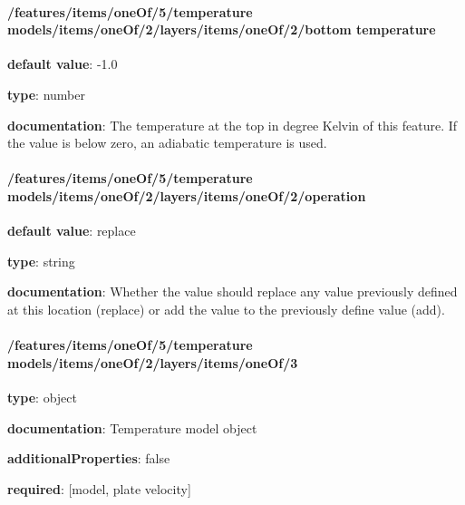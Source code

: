 \begin{itemized}
\end{itemized}\paragraph{/features/items/oneOf/5/temperature models/items/oneOf/2/layers/items/oneOf/2/bottom temperature} \begin{itemized}
\item {\bf default value}: -1.0
\item {\bf type}: number
\item {\bf documentation}: The temperature at the top in degree Kelvin of this feature. If the value is below zero, an adiabatic temperature is used.
\end{itemized}\paragraph{/features/items/oneOf/5/temperature models/items/oneOf/2/layers/items/oneOf/2/operation} \begin{itemized}
\item {\bf default value}: replace
\item {\bf type}: string
\item {\bf documentation}: Whether the value should replace any value previously defined at this location (replace) or add the value to the previously define value (add).
\end{itemized}\paragraph{/features/items/oneOf/5/temperature models/items/oneOf/2/layers/items/oneOf/3} \begin{itemized}
\item {\bf type}: object
\item {\bf documentation}: Temperature model object
\item {\bf additionalProperties}: false
\item {\bf required}: [model, plate velocity]\end{itemized}
